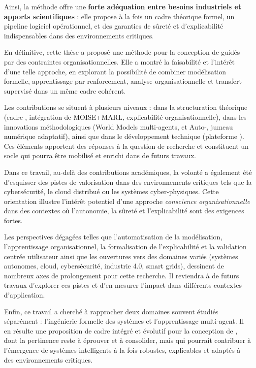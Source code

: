 \medskip
\noindent
Ainsi, la méthode  offre une \textbf{forte adéquation entre besoins industriels et apports scientifiques} :
elle propose à la fois un cadre théorique formel, un pipeline logiciel opérationnel, et des garanties de sûreté et d'explicabilité indispensables dans des environnements critiques.

\bigskip
\noindent
\medskip
\noindent
En définitive, cette thèse a proposé une méthode pour la conception de  guidés par des contraintes organisationnelles.
Elle a montré la faisabilité et l'intérêt d'une telle approche, en explorant la possibilité de combiner modélisation formelle, apprentissage par renforcement, analyse organisationnelle et transfert supervisé dans un même cadre cohérent.

\medskip
\noindent
Les contributions se situent à plusieurs niveaux : dans la structuration théorique (cadre , intégration de MOISE+MARL, explicabilité organisationnelle), dans les innovations méthodologiques (World Models multi-agents,  et Auto-, jumeau numérique adaptatif), ainsi que dans le développement technique (plateforme ).
Ces éléments apportent des réponses à la question de recherche et constituent un socle qui pourra être mobilisé et enrichi dans de futurs travaux.

\medskip
\noindent
Dans ce travail, au-delà des contributions académiques, la volonté a également été d'esquisser des pistes de valorisation dans des environnements critiques tels que la cybersécurité, le cloud distribué ou les systèmes cyber-physiques.
Cette orientation illustre l'intérêt potentiel d'une approche \textit{conscience organisationnelle} dans des contextes où l'autonomie, la sûreté et l'explicabilité sont des exigences fortes.

\medskip
\noindent
Les perspectives dégagées telles que l'automatisation de la modélisation, l'apprentissage organisationnel, la formalisation de l'explicabilité et la validation centrée utilisateur ainsi que les ouvertures vers des domaines variés (systèmes autonomes, cloud, cybersécurité, industrie 4.0, smart grids), dessinent de nombreux axes de prolongement pour cette recherche.
Il reviendra à de futurs travaux d'explorer ces pistes et d'en mesurer l'impact dans différents contextes d'application.

\medskip
\noindent
Enfin, ce travail a cherché à rapprocher deux domaines souvent étudiés séparément : l'ingénierie formelle des systèmes et l'apprentissage multi-agent.
Il en résulte une proposition de cadre intégré et évolutif pour la conception de , dont la pertinence reste à éprouver et à consolider, mais qui pourrait contribuer à l'émergence de systèmes intelligents à la fois robustes, explicables et adaptés à des environnements critiques.


\clearpage
\thispagestyle{empty}
\null
\newpage
